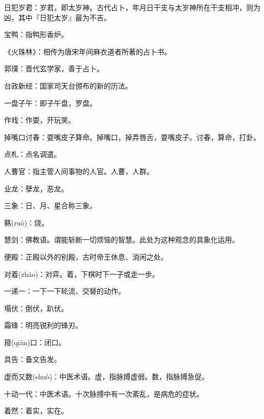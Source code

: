 \startbuffer[405]
日犯岁君：岁君，即太岁神。古代占卜，年月日干支与太岁神所在干支相冲，则为凶，其中『日犯太岁』最为不吉。
\stopbuffer


\startbuffer[406]
宝鸭：指鸭形香炉。
\stopbuffer


\startbuffer[407]
《火珠林》：相传为唐宋年间麻衣道者所著的占卜书。
\stopbuffer


\startbuffer[408]
郭璞：晋代玄学家，善于占卜。
\stopbuffer


\startbuffer[409]
台政新经：国家司天台颁布的新的历法。
\stopbuffer


\startbuffer[410]
一盘子午：即子午盘，罗盘。
\stopbuffer


\startbuffer[411]
作戏：作耍，开玩笑。
\stopbuffer


\startbuffer[412]
掉嘴口讨春：耍嘴皮子算命。掉嘴口，掉弄唇舌，耍嘴皮子。讨春，算命，打卦。
\stopbuffer


\startbuffer[413]
点札：点名调遣。
\stopbuffer


\startbuffer[414]
人曹官：指主管人间事物的人官。人曹，人群。
\stopbuffer


\startbuffer[415]
业龙：孽龙，恶龙。
\stopbuffer


\startbuffer[416]
三象：日、月、星合称三象。
\stopbuffer


\startbuffer[417]
爇(ruò)：烧。
\stopbuffer


\startbuffer[418]
慧剑：佛教语。谓能斩断一切烦恼的智慧。此处为这种观念的具象化运用。
\stopbuffer


\startbuffer[419]
便殿：正殿以外的别殿，古时帝王休息、消闲之处。
\stopbuffer


\startbuffer[420]
对着(zhāo)：对弈。着，下棋时下一子或走一步。
\stopbuffer


\startbuffer[421]
一递一：一下一下轮流、交替的动作。
\stopbuffer


\startbuffer[422]
塌伏：倒伏，趴伏。
\stopbuffer


\startbuffer[423]
霜锋：明亮锐利的锋刃。
\stopbuffer


\startbuffer[424]
箝(qián)口：闭口。
\stopbuffer


\startbuffer[425]
具告：备文告发。
\stopbuffer


\startbuffer[426]
虚而又数(shuò)：中医术语。虚，指脉搏虚弱。数，指脉搏急促。
\stopbuffer


\startbuffer[427]
十动一代：中医术语。十次脉搏中有一次紊乱，是病危的症状。
\stopbuffer


\startbuffer[428]
着然：着实，实在。
\stopbuffer


